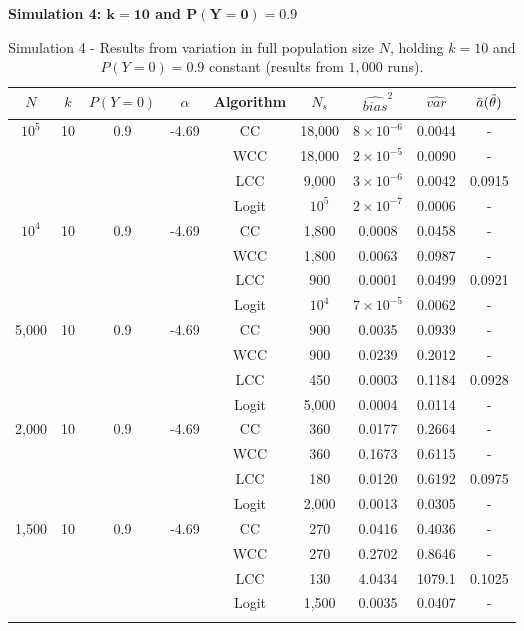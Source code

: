 \textbf{Simulation 4: $\mathbf{k=10}$ and $\mathbf{P(Y=0)=0.9}$}\\

\begin{longtable}{ccccccccc}
\toprule
$N$ & $k$ & $P(Y=0)$ & $\alpha$ & Algorithm & $N_s$ & $\widehat{bias}^2$ & $\widehat{var}$ & $\Bar{a}(\Tilde{\theta})$\\
\midrule
 $10^5$ & 10 & 0.9 & -4.69 & CC & 18,000 & $8\times10^{-6}$ & 0.0044 & - \\
 & & & & WCC & 18,000 & $2\times10^{-5}$ & 0.0090 & -\\
 & & & & LCC & 9,000 & $3\times10^{-6}$ & 0.0042 & 0.0915 \\
 & & & & Logit & $10^{5}$ & $2\times10^{-7}$ & 0.0006 & - \\
 \midrule
 $10^4$ & 10 & 0.9 & -4.69 & CC & 1,800 & 0.0008 & 0.0458 & - \\
 & & & & WCC & 1,800 & 0.0063 & 0.0987 & - \\
 & & & & LCC & 900 & 0.0001 & 0.0499 & 0.0921 \\
 & & & & Logit & $10^4$ & $7\times10^{-5}$ & 0.0062 & - \\
 \midrule
 5,000 & 10 & 0.9 & -4.69 & CC & 900 & 0.0035 & 0.0939 & - \\
 & & & & WCC & 900 & 0.0239 & 0.2012 & - \\
 & & & & LCC & 450 & 0.0003 & 0.1184 & 0.0928 \\
 & & & & Logit & 5,000 & 0.0004 & 0.0114 & - \\
 \midrule
 2,000 & 10 & 0.9 & -4.69 & CC & 360 & 0.0177 & 0.2664 & - \\
 & & & & WCC & 360 & 0.1673 & 0.6115 & - \\
 & & & & LCC & 180 & 0.0120 & 0.6192 & 0.0975 \\
 & & & & Logit & 2,000 & 0.0013 & 0.0305 & - \\
\midrule
 1,500 & 10 & 0.9 & -4.69 & CC & 270 & 0.0416 & 0.4036 & - \\
 & & & & WCC & 270 & 0.2702 & 0.8646 & - \\
 & & & & LCC & 130 & 4.0434 & 1079.1 & 0.1025 \\
 & & & & Logit & 1,500 & 0.0035 & 0.0407 & - \\
\bottomrule
\caption[Simulation 4 - Results from variation in full population size $N$, holding $k=10$ and $P(Y=0)=0.9$ constant]{Simulation 4 - Results from variation in full population size $N$, holding $k=10$ and $P(Y=0)=0.9$ constant (results from $1,000$ runs).}
\label{tab:sim4-0.9}
\end{longtable}

